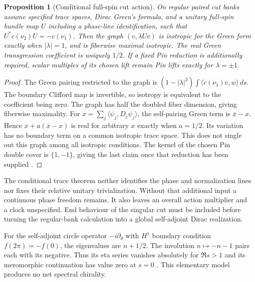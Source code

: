 \documentclass[11pt]{article}
\theoremstyle{readable}
\newtheorem{proposition}[theorem]{Proposition}
\theoremstyle{remark}\newtheorem{remark}[theorem]{Remark}
\newcommand{\dd}{\,d}\newcommand{\norm}[1]{\left\lVert#1\right\rVert}
\begin{document}
\begin{proposition}[Conditional full-spin cut action]
On regular paired cut banks assume specified trace spaces, Dirac Green's
formula, and a unitary full-spin bundle map $U$ including a phase-line
identification, such that $U^*c(\nu_2)U=-c(\nu_1)$.
Then the graph $(v,\lambda Uv)$ is isotropic for the Green form exactly
when $|\lambda|=1$, and is fiberwise maximal isotropic.
The real Green transgression coefficient is uniquely $1/2$.
If a fixed Pin reduction is additionally required, scalar multiples of its
chosen lift remain Pin lifts exactly for $\lambda=\pm1$.
\end{proposition}
\begin{proof}
The Green pairing restricted to the graph is
$(1-|\lambda|^2)\int\langle c(\nu_1)v,w\rangle\dd s$.
The boundary Clifford map is invertible, so isotropy is equivalent to the
coefficient being zero. The graph has half the doubled fiber dimension,
giving fiberwise maximality. For
$x=\sum_j\langle\psi_j,D_j\psi_j\rangle$, the self-pairing Green term is
$\bar x-x$. Hence $x+a(\bar x-x)$ is real for arbitrary $x$ exactly when
$a=1/2$. Its variation has no boundary term on a common isotropic trace
space. This does not single out this graph among all isotropic conditions.
The kernel of the chosen Pin double cover is $\{1,-1\}$, giving the last
claim once that reduction has been supplied \cite{dirac,pin}.
\end{proof}
The conditional trace theorem neither identifies the phase and normalization
lines nor fixes their relative unitary trivialization. Without that additional
input a continuous phase freedom remains. It also leaves an overall action
multiplier and a clock unspecified. End behaviour of the singular cut must
be included before turning the regular-bank calculation into a global
self-adjoint Dirac realization.

For the self-adjoint circle operator $-i\partial_\theta$ with
$H^1$ boundary condition $f(2\pi)=-f(0)$, the eigenvalues are
$n+1/2$. The involution $n\mapsto-n-1$ pairs each with its negative.
Thus its eta series vanishes absolutely for $\Re s>1$ and its meromorphic
continuation has value zero at $s=0$ \cite{aps}. This elementary model
produces no net spectral chirality.
\end{document}
